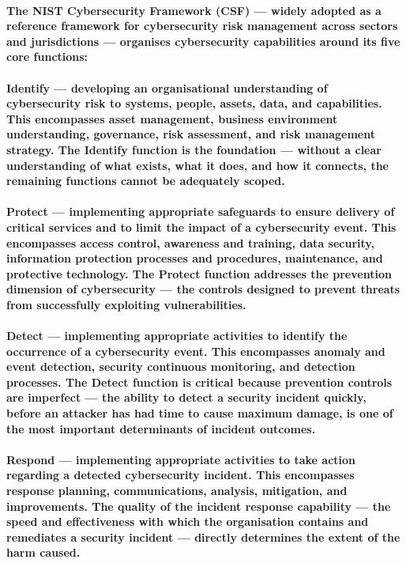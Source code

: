 \paragraph{The NIST Cybersecurity Framework (CSF) — widely adopted as a reference framework for cybersecurity risk management across sectors and jurisdictions — organises cybersecurity capabilities around its five core functions:}
\paragraph{\textbf{Identify} — developing an organisational understanding of cybersecurity risk to systems, people, assets, data, and capabilities. This encompasses asset management, business environment understanding, governance, risk assessment, and risk management strategy. The Identify function is the foundation — without a clear understanding of what exists, what it does, and how it connects, the remaining functions cannot be adequately scoped.}
\paragraph{\textbf{Protect} — implementing appropriate safeguards to ensure delivery of critical services and to limit the impact of a cybersecurity event. This encompasses access control, awareness and training, data security, information protection processes and procedures, maintenance, and protective technology. The Protect function addresses the prevention dimension of cybersecurity — the controls designed to prevent threats from successfully exploiting vulnerabilities.}
\paragraph{\textbf{Detect} — implementing appropriate activities to identify the occurrence of a cybersecurity event. This encompasses anomaly and event detection, security continuous monitoring, and detection processes. The Detect function is critical because prevention controls are imperfect — the ability to detect a security incident quickly, before an attacker has had time to cause maximum damage, is one of the most important determinants of incident outcomes.}
\paragraph{\textbf{Respond} — implementing appropriate activities to take action regarding a detected cybersecurity incident. This encompasses response planning, communications, analysis, mitigation, and improvements. The quality of the incident response capability — the speed and effectiveness with which the organisation contains and remediates a security incident — directly determines the extent of the harm caused.}
